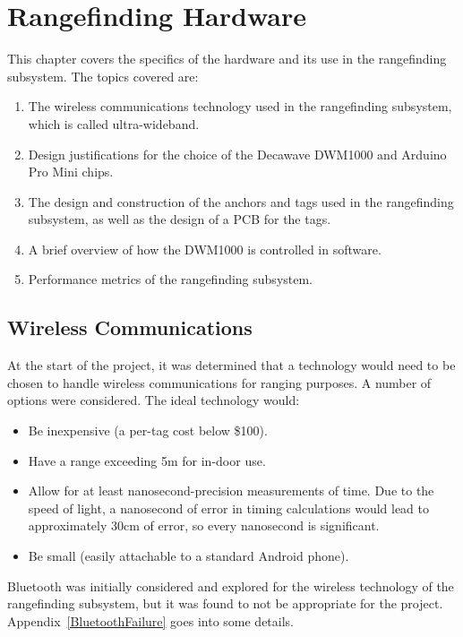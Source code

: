 
\chapter{Rangefinding Hardware} %

\label{RangefindingHardware}

This chapter covers the specifics of the hardware and its use in the rangefinding subsystem. The topics covered are:
\begin{enumerate}
	\item The wireless communications technology used in the rangefinding subsystem, which is called ultra-wideband.
	\item Design justifications for the choice of the Decawave DWM1000 and Arduino Pro Mini chips.
	\item The design and construction of the anchors and tags used in the rangefinding subsystem, as well as the design of a PCB for the tags.
	\item A brief overview of how the DWM1000 is controlled in software.
	\item Performance metrics of the rangefinding subsystem.
\end{enumerate}

\section{Wireless Communications}
At the start of the project, it was determined that a technology would need to be chosen to handle wireless communications for ranging purposes. A number of options were considered. The ideal technology would:
\begin{itemize}
	\item Be inexpensive (a per-tag cost below \$100).
	\item Have a range exceeding 5m for in-door use.
	\item Allow for at least nanosecond-precision measurements of time. Due to the speed of light, a nanosecond of error in timing calculations would lead to approximately 30cm of error, so every nanosecond is significant.
	\item Be small (easily attachable to a standard Android phone).
\end{itemize}

Bluetooth was initially considered and explored for the wireless technology of the rangefinding subsystem, but it was found to not be appropriate for the project. Appendix~\ref{BluetoothFailure} goes into some details.


